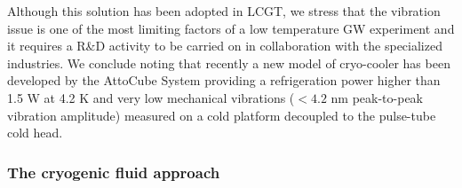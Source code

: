 Although this solution has been adopted in LCGT,  we stress that the vibration issue  is one of the  most limiting  factors of a low temperature GW experiment and  it requires a  R\&D activity to be carried on in collaboration with the specialized industries. We conclude noting that recently a new model of cryo-cooler has been developed by the AttoCube System \cite{attocube} providing a refrigeration power higher than 1.5 W at 4.2 K  and  very low mechanical vibrations ($< 4.2$ nm peak-to-peak vibration amplitude) measured on a cold  platform decoupled to the pulse-tube cold head. 



\FloatBarrier
 \subsubsection{The cryogenic fluid approach}
 \label{sec:cryofluids}

